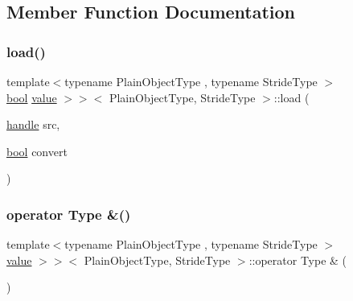 \subsection{Member Function Documentation}
\mbox{\label{structtype__caster_3_01_eigen_1_1_ref_3_01_plain_object_type_00_010_00_01_stride_type_01_4_00_014483c445e66b0d8d9bb7fc2aa837ecac_a309c5508a42ddc540a20c3e3cb733ba6}} 
\subsubsection{\texorpdfstring{load()}{load()}}
{\footnotesize\ttfamily template$<$typename Plain\+Object\+Type , typename Stride\+Type $>$ \\
\mbox{\hyperlink{asdl_8h_af6a258d8f3ee5206d682d799316314b1}{bool}} \mbox{\hyperlink{_s_d_l__opengl__glext_8h_a8ad81492d410ff2ac11f754f4042150f}{value}} $>$$>$$<$ Plain\+Object\+Type, Stride\+Type $>$\+::load (\begin{DoxyParamCaption}\item[{\mbox{\hyperlink{classhandle}{handle}}}]{src,  }\item[{\mbox{\hyperlink{asdl_8h_af6a258d8f3ee5206d682d799316314b1}{bool}}}]{convert }\end{DoxyParamCaption})\hspace{0.3cm}{\ttfamily [inline]}}

\mbox{\label{structtype__caster_3_01_eigen_1_1_ref_3_01_plain_object_type_00_010_00_01_stride_type_01_4_00_014483c445e66b0d8d9bb7fc2aa837ecac_ad827f6b614a298d03de2029da5f56639}} 
\subsubsection{\texorpdfstring{operator Type \&()}{operator Type \&()}}
{\footnotesize\ttfamily template$<$typename Plain\+Object\+Type , typename Stride\+Type $>$ \\
\mbox{\hyperlink{_s_d_l__opengl__glext_8h_a8ad81492d410ff2ac11f754f4042150f}{value}} $>$$>$$<$ Plain\+Object\+Type, Stride\+Type $>$\+::operator Type \& (\begin{DoxyParamCaption}{ }\end{DoxyParamCaption})\hspace{0.3cm}{\ttfamily [inline]}}

